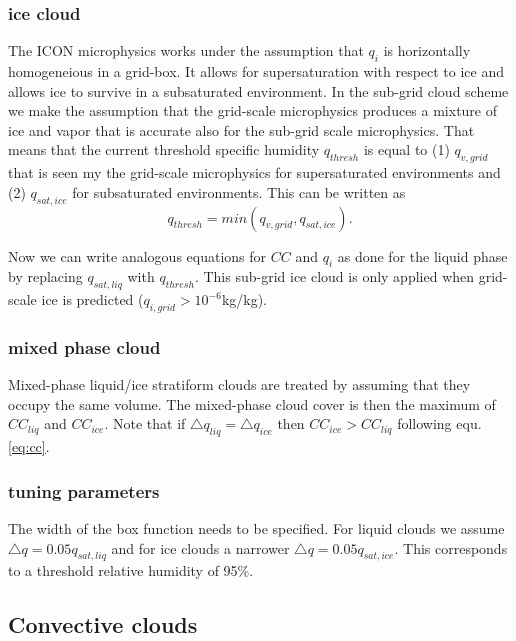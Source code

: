 \documentclass[a4paper,11pt]{article}
\begin{document}
\subsubsection{ice cloud}

The ICON microphysics works under the assumption that $q_i$ is horizontally homogeneious in a grid-box.
It allows for supersaturation with respect to ice and allows ice to survive in a subsaturated environment.
In the sub-grid cloud scheme we make the assumption that the grid-scale microphysics produces a mixture of
ice and vapor that is accurate also for the sub-grid scale microphysics.  That means that the current threshold
specific humidity $q_{thresh}$ is equal to (1) $q_{v,grid}$ that is seen my the grid-scale microphysics for supersaturated
environments and (2) $q_{sat,ice}$ for subsaturated environments.  This can be written as
\begin{equation}
q_{thresh} =  min(q_{v,grid}, q_{sat,ice}).
\end{equation}

Now we can write analogous equations for $CC$ and $q_i$ as done for the liquid phase by replacing $q_{sat,liq}$
with $q_{thresh}$.  This sub-grid ice cloud is only applied when grid-scale ice is predicted 
($q_{i,grid} > 10^{-6}$kg/kg).


\subsubsection{mixed phase cloud}

Mixed-phase liquid/ice stratiform clouds are treated by assuming that they occupy the same volume.  
The mixed-phase cloud cover is then the maximum of $CC_{liq}$ and $CC_{ice}$.  Note that if 
$\triangle q_{liq} = \triangle q_{ice}$ then $CC_{ice} > CC_{liq}$ following equ. \ref{eq:cc}.
 


\subsubsection{tuning parameters}

The width of the box function needs to be specified.  For liquid clouds we assume $\triangle q = 0.05 q_{sat,liq}$
and for ice clouds a narrower $\triangle q = 0.05 q_{sat,ice}$.  This corresponds to a threshold 
relative humidity of 95\%.


\subsection{Convective clouds}
\end{document}
